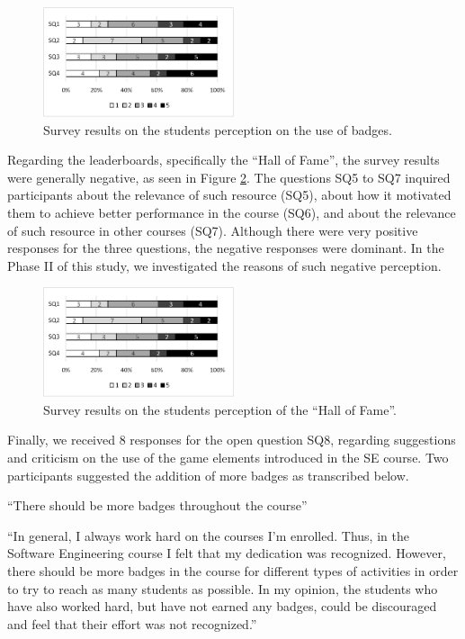 \begin{figure}[!h]%
\centering
\includegraphics[width = 0.5\textwidth]{img/gamificationSQ14.png}
\caption{Survey results on the students perception on the use of badges.}
\label{fig:gamificationsq14}
\end{figure}

Regarding the leaderboards, specifically the “Hall of Fame”, the survey results were generally negative, as seen in Figure \ref{fig:gamificationsq57}. The questions SQ5 to SQ7 inquired participants about the relevance of such resource (SQ5), about how it motivated them to achieve better performance in the course (SQ6), and about the relevance of such resource in other courses (SQ7). Although there were very positive responses for the three questions, the negative responses were dominant. In the Phase II of this study, we investigated the reasons of such negative perception.

\begin{figure}[!h]%
\centering
\includegraphics[width = 0.5\textwidth]{img/gamificationSQ14.png}
\caption{Survey results on the students perception of the “Hall of Fame”.}
\label{fig:gamificationsq57}
\end{figure}


Finally, we received 8 responses for the open question SQ8, regarding suggestions and criticism on the use of the game elements introduced in the SE course. Two participants suggested the addition of more badges as transcribed below.

“There should be more badges throughout the course”

“In general, I always work hard on the courses I'm enrolled. Thus, in the Software Engineering course I felt that my dedication was recognized. However, there should be more badges in the course for different types of activities in order to try to reach as many students as possible. In my opinion, the students who have also worked hard, but have not earned any badges, could be discouraged and feel that their effort was not recognized.”

